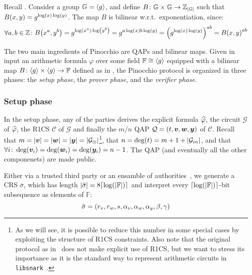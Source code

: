 \begin{example}\label{ex:bilinear_map}
  Recall .
  Consider a group \(\mathbb{G} = \left\langle g\right\rangle\), and define 
  \(B\colon \mathbb{G} \times \mathbb{G} \to \mathbb{Z}_{\left\lvert\mathbb{G}\right\rvert}\) such that 
  \(\call{B}{x, y} = g^{\call{\log}{x}\call{\log}{y}}\). The map \(B\) is bilinear 
  w.r.t.\ exponentiation, since:
  \[
    \forall a,b \in \mathbb{Z}\colon \call{B}{x^a, y^b} = g^{\call{\log}{x^a}\call{\log}{y^b}} = 
    g^{a\call{\log}{x}b\call{\log}{y}} = \Parens*{g^{\call{\log}{x}\call{\log}{y}}}^{ab}
    = \call{B}{x, y}^{ab}
  \]
\end{example}

The two main ingredients of Pinocchio are QAPs and bilinear maps.
Given in input an arithmetic formula \(\varphi \) over some field \(\mathbb{F} \cong \left\langle g\right\rangle\) 
equipped with a bilinear map \(B\colon \gengroup{g} \times \gengroup{g} \to \mathbb{F}\) defined as 
in , the Pinocchio protocol is organized in three phases: the 
\emph{setup phase}, the \emph{prover phase}, and the \emph{verifier phase}.

\subsubsection*{Setup phase}
In the setup phase, any of the parties derives the explicit formula \(\widehat{\varphi}\), 
the circuit \(\mathcal{G}\) of \(\widehat{\varphi}\), the R1CS \(\mathcal{C}\) of \(\mathcal{G}\) 
and finally the \(m/n\) QAP \(\mathcal{Q} = \left(t, \bm{v}, \bm{w}, \bm{y}\right)\) of \(\mathcal{C}\).
Recall that \(m = \left\lvert\bm{v}\right\rvert = \left\lvert\bm{w}\right\rvert = \left\lvert\bm{y}\right\rvert = \left\lvert\mathcal{G}_{\otimes}\right\rvert\)\footnote{
  As we will see, it is possible to reduce this number in some special cases by exploiting the 
  structure of R1CS constraints.
  Also note that the original protocol as in~\cite{ParnoGHR2013} does not make explicit use of 
  R1CS, but we want to stress its importance as it is the standard way to represent arithmetic 
  circuits in \texttt{libsnark}~\cite{SassonCTV2013}.
  }, 
that \(n = \call{\deg}{t} = m + 1 + \abs{\mathcal{G}_{in}}\), and that 
\(\forall i\colon \call{\deg}{\bm{v}_i} = \call{\deg}{\bm{w}_i} = \call{\deg}{\bm{y}_i} = n - 1\).
The QAP (and eventually all the other componenets) are made public.

Either via a trusted third party or an ensamble of authorities~\cite{GrothO2006}, we generate 
a CRS \(\overbar{\sigma}\), which has length 
\(\abs{\overbar{\sigma}} = 8\Ceil*{\call{\log}{\abs{\mathbb{F}}}}\) and interpret every 
\(\Ceil*{\call{\log}{\abs{\mathbb{F}}}}\)-bit subsequence as elements of \(\mathbb{F}\): 
\[\overbar{\sigma} = \Tuple{r_v, r_w, s, \alpha_v, \alpha_w, \alpha_y, \beta, \gamma}\]

